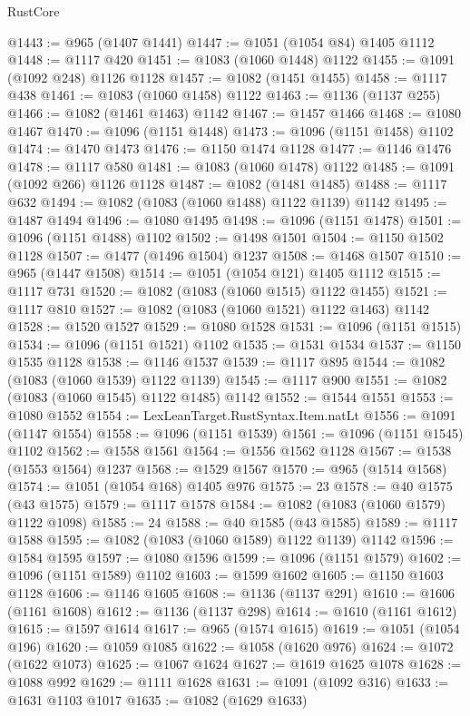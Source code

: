 \begin{lexlean}{RustCore}
\begin{coremodule}
@1443 := @965 (@1407 @1441)
@1447 := @1051 (@1054 @84) @1405 @1112
@1448 := @1117 @420
@1451 := @1083 (@1060 @1448) @1122
@1455 := @1091 (@1092 @248) @1126 @1128
@1457 := @1082 (@1451 @1455)
@1458 := @1117 @438
@1461 := @1083 (@1060 @1458) @1122
@1463 := @1136 (@1137 @255)
@1466 := @1082 (@1461 @1463) @1142
@1467 := @1457 @1466
@1468 := @1080 @1467
@1470 := @1096 (@1151 @1448)
@1473 := @1096 (@1151 @1458) @1102
@1474 := @1470 @1473
@1476 := @1150 @1474 @1128
@1477 := @1146 @1476
@1478 := @1117 @580
@1481 := @1083 (@1060 @1478) @1122
@1485 := @1091 (@1092 @266) @1126 @1128
@1487 := @1082 (@1481 @1485)
@1488 := @1117 @632
@1494 := @1082 (@1083 (@1060 @1488) @1122 @1139) @1142
@1495 := @1487 @1494
@1496 := @1080 @1495
@1498 := @1096 (@1151 @1478)
@1501 := @1096 (@1151 @1488) @1102
@1502 := @1498 @1501
@1504 := @1150 @1502 @1128
@1507 := @1477 (@1496 @1504) @1237
@1508 := @1468 @1507
@1510 := @965 (@1447 @1508)
@1514 := @1051 (@1054 @121) @1405 @1112
@1515 := @1117 @731
@1520 := @1082 (@1083 (@1060 @1515) @1122 @1455)
@1521 := @1117 @810
@1527 := @1082 (@1083 (@1060 @1521) @1122 @1463) @1142
@1528 := @1520 @1527
@1529 := @1080 @1528
@1531 := @1096 (@1151 @1515)
@1534 := @1096 (@1151 @1521) @1102
@1535 := @1531 @1534
@1537 := @1150 @1535 @1128
@1538 := @1146 @1537
@1539 := @1117 @895
@1544 := @1082 (@1083 (@1060 @1539) @1122 @1139)
@1545 := @1117 @900
@1551 := @1082 (@1083 (@1060 @1545) @1122 @1485) @1142
@1552 := @1544 @1551
@1553 := @1080 @1552
@1554 := LexLeanTarget.RustSyntax.Item.natLt
@1556 := @1091 (@1147 @1554)
@1558 := @1096 (@1151 @1539)
@1561 := @1096 (@1151 @1545) @1102
@1562 := @1558 @1561
@1564 := @1556 @1562 @1128
@1567 := @1538 (@1553 @1564) @1237
@1568 := @1529 @1567
@1570 := @965 (@1514 @1568)
@1574 := @1051 (@1054 @168) @1405 @976
@1575 := 23
@1578 := @40 @1575 (@43 @1575)
@1579 := @1117 @1578
@1584 := @1082 (@1083 (@1060 @1579) @1122 @1098)
@1585 := 24
@1588 := @40 @1585 (@43 @1585)
@1589 := @1117 @1588
@1595 := @1082 (@1083 (@1060 @1589) @1122 @1139) @1142
@1596 := @1584 @1595
@1597 := @1080 @1596
@1599 := @1096 (@1151 @1579)
@1602 := @1096 (@1151 @1589) @1102
@1603 := @1599 @1602
@1605 := @1150 @1603 @1128
@1606 := @1146 @1605
@1608 := @1136 (@1137 @291)
@1610 := @1606 (@1161 @1608)
@1612 := @1136 (@1137 @298)
@1614 := @1610 (@1161 @1612)
@1615 := @1597 @1614
@1617 := @965 (@1574 @1615)
@1619 := @1051 (@1054 @196)
@1620 := @1059 @1085
@1622 := @1058 (@1620 @976)
@1624 := @1072 (@1622 @1073)
@1625 := @1067 @1624
@1627 := @1619 @1625 @1078
@1628 := @1088 @992
@1629 := @1111 @1628
@1631 := @1091 (@1092 @316)
@1633 := @1631 @1103 @1017
@1635 := @1082 (@1629 @1633)

\end{coremodule}
\end{lexlean}
